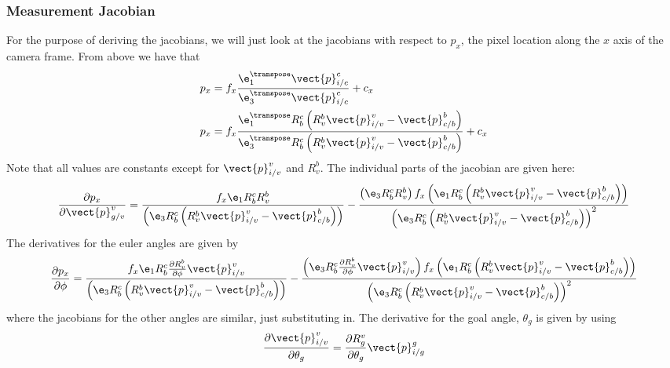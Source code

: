 \subsubsection{Measurement Jacobian}
For the purpose of deriving the jacobians, we will just look at the jacobians
with respect to $p_x$, the pixel location along the $x$ axis of the camera
frame. From above we have that
\begin{align}
  p_x &= f_x \frac{\e_1^\transpose \vect{p}_{i/c}^c}{\e_3^\transpose \vect{p}_{i/c}^c} + c_x \\ 
  p_x &= f_x \frac{\e_1^\transpose R_b^c \left(R_v^b \vect{p}_{i/v}^v -
      \vect{p}_{c/b}^b\right) }{\e_3^\transpose R_b^c \left(R_v^b \vect{p}_{i/v}^v -
  \vect{p}_{c/b}^b\right) } + c_x 
\end{align}
Note that all values are constants except for $\vect{p}_{i/v}^v$ and $R_v^b$.
The individual parts of the jacobian are given here:
\begin{equation}
  \frac{\partial p_x}{\partial \vect{p}_{g/v}^v} =
  \frac{f_x \e_1 R_b^c R_v^b}
    {\left(\e_3 R_b^c \left(R_v^b \vect{p}_{i/v}^v -
    \vect{p}_{c/b}^b\right)\right)}
    - \frac{\left(\e_3 R_b^c R_v^b \right) f_x \left(\e_1 R_b^c \left(R_v^b \vect{p}_{i/v}^v -
        \vect{p}_{c/b}^b\right)\right)} {\left(\e_3 R_b^c \left(R_v^b \vect{p}_{i/v}^v -
  \vect{p}_{c/b}^b\right)\right)^2}
\end{equation}
The derivatives for the euler angles are given by
\begin{equation}
  \frac{\partial p_x}{\partial \phi} =
  \frac{f_x \e_1 R_b^c \frac{\partial R_v^b}{\partial \phi} \vect{p}_{i/v}^v}
    {\left(\e_3 R_b^c \left(R_v^b \vect{p}_{i/v}^v -
    \vect{p}_{c/b}^b\right)\right)}
    - \frac{\left(\e_3 R_b^c \frac{\partial R_v^b}{\partial \phi} \vect{p}_{i/v}^v \right) f_x \left(\e_1 R_b^c \left(R_v^b \vect{p}_{i/v}^v -
        \vect{p}_{c/b}^b\right)\right)} {\left(\e_3 R_b^c \left(R_v^b \vect{p}_{i/v}^v -
  \vect{p}_{c/b}^b\right)\right)^2}
\end{equation}
where the jacobians for the other angles are similar, just substituting in.
The derivative for the goal angle, $\theta_g$ is given by using
\begin{equation}
  \frac{\partial \vect{p}_{i/v}^v}{\partial \theta_g} =
  \frac{\partial R_g^v}{\partial \theta_g} \vect{p}_{i/g}^g
\end{equation}
